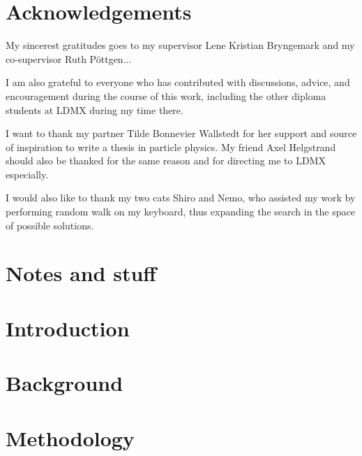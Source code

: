 \section*{Acknowledgements}

My sincerest gratitudes goes to my supervisor Lene Kristian Bryngemark and my co-supervisor Ruth Pöttgen...

I am also grateful to everyone who has contributed with discussions, advice, and encouragement during the course of this work, including the other diploma students at LDMX during my time there. 

I want to thank my partner Tilde Bonnevier Wallstedt for her support and source of inspiration to write a thesis in particle physics. My friend Axel Helgstrand should also be thanked for the same reason and for directing me to LDMX especially. 

I would also like to thank my two cats Shiro and Nemo, who assisted my work by performing random walk on my keyboard, thus expanding the search in the space of possible solutions.

\clearpage
\tableofcontents

\clearpage
\section*{Notes and stuff}


\newpage
\section{Introduction}


\newpage
\section{Background}


%

\section{Methodology}
\label{sec:method}



